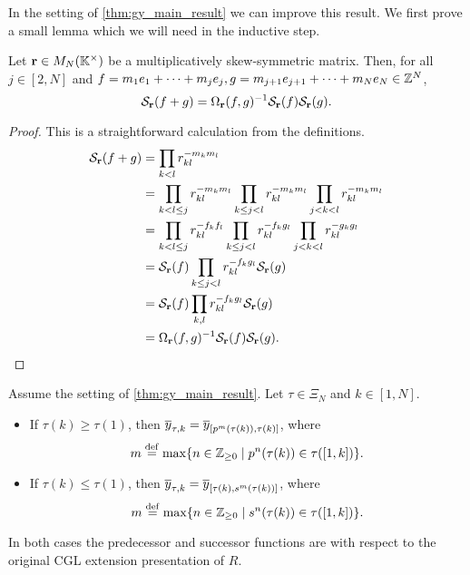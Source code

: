 In the setting of \cref{thm:gy_main_result} we can improve this result. We first prove
a small lemma which we will need in the inductive step.
\begin{lemma}\label{lem:symmetrization_of_sum}

	Let $\mathbf{r} \in M_N(\mathbb{K}^\times)$ be a multiplicatively skew-symmetric matrix. Then, for
	all $j \in [2, N]$ and $f = m_1 e_1 + \dots + m_j e_j, g = m_{j+1} e_{j+1} + \dots +
		m_{N} e_N \in \mathbb{Z}^N$,
	\begin{equation*}
		\mathcal{S}_{\mathbf{r}}(f+g) = \Omega_{\mathbf{r}}(f,g)^{-1} \mathcal{S}_{\mathbf{r}}(f)\mathcal{S}_{\mathbf{r}}(g).
	\end{equation*}
\end{lemma}
\begin{proof}
	This is a straightforward calculation from the definitions.
	\begin{align*}
		\mathcal{S}_{\mathbf{r}}(f+g)
		 & = \prod_{k < l}r_{kl}^{-m_k m_l}                                                                                 \\
		 & = \prod_{k < l \leq j}r_{kl}^{-m_k m_l} \prod_{k \leq j < l}r_{kl}^{-m_k m_l} \prod_{j < k < l}r_{kl}^{-m_k m_l} \\
		 & = \prod_{k < l \leq j}r_{kl}^{-f_k f_l} \prod_{k \leq j < l}r_{kl}^{-f_k g_l} \prod_{j < k < l}r_{kl}^{-g_k g_l} \\
		 & = \mathcal{S}_{\mathbf{r}}(f) \prod_{k \leq j < l}r_{kl}^{-f_k g_l} \mathcal{S}_{\mathbf{r}}(g)                                            \\
		 & = \mathcal{S}_{\mathbf{r}}(f) \prod_{k, l}r_{kl}^{-f_k g_l} \mathcal{S}_{\mathbf{r}}(g)                                                    \\
		 & = \Omega_{\mathbf{r}}(f,g)^{-1} \mathcal{S}_{\mathbf{r}}(f) \mathcal{S}_{\mathbf{r}}(g).
	\end{align*}
\end{proof}
\begin{proposition}\label{prop:y_tau_is_y_bracket}
	Assume the setting of \cref{thm:gy_main_result}. Let $\tau \in \Xi_N$ and $k \in [1, N]$.
	\begin{itemize}
		\item If $\tau(k) \geq \tau(1)$, then $\overline{y}_{\tau,k} = \overline{y}_{[p^m(\tau(k)), \tau(k)]}$, where
		      \begin{equation*}
			      m \overset{\mathrm{def}}{=} \max\{n \in \mathbb{Z}_{\geq 0} \mid p^n(\tau(k)) \in \tau([1,k])\}.
		      \end{equation*}
		\item If $\tau(k) \leq \tau(1)$, then $\overline{y}_{\tau,k} = \overline{y}_{[\tau(k),s^m( \tau(k))]}$, where
		      \begin{equation*}
			      m \overset{\mathrm{def}}{=} \max\{n \in \mathbb{Z}_{\geq 0} \mid s^n(\tau(k)) \in \tau([1,k])\}.
		      \end{equation*}
	\end{itemize}
	In both cases the predecessor and successor functions are with respect to the original
	CGL extension presentation of $R$.
\end{proposition}
